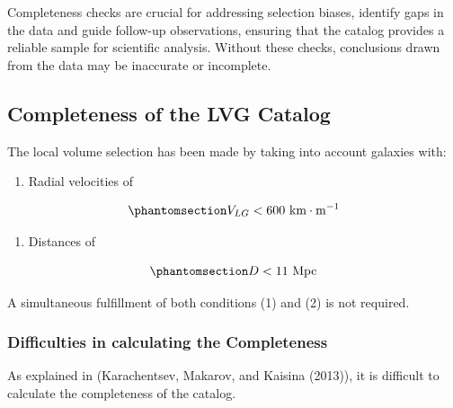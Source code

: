 \documentclass[
]{article}
\providecommand{\tightlist}{%
  \setlength{\itemsep}{0pt}\setlength{\parskip}{0pt}}\usepackage{longtable,booktabs,array}
\begin{document}
Completeness checks are crucial for addressing selection biases,
identify gaps in the data and guide follow-up observations, ensuring
that the catalog provides a reliable sample for scientific analysis.
Without these checks, conclusions drawn from the data may be inaccurate
or incomplete.

\subsection{Completeness of the LVG
Catalog}\label{completeness-of-the-lvg-catalog}

The local volume selection has been made by taking into account galaxies
with:

\begin{enumerate}
\def\labelenumi{\arabic{enumi}.}
\tightlist
\item
  Radial velocities of
\end{enumerate}

\begin{equation}\phantomsection\label{eq-lvg-vel}{
     V_{LG}<600 \text{ km}\cdot\text{m}^{-1}
}\end{equation}

\begin{enumerate}
\def\labelenumi{\arabic{enumi}.}
\tightlist
\item
  Distances of
\end{enumerate}

\begin{equation}\phantomsection\label{eq-lvg-dis}{
       D<11\ \text{Mpc}
}\end{equation}

A simultaneous fulfillment of both conditions (1) and (2) is not
required.

\subsubsection{Difficulties in calculating the
Completeness}\label{difficulties-in-calculating-the-completeness}

As explained in (Karachentsev, Makarov, and Kaisina (2013)), it is
difficult to calculate the completeness of the catalog.
\end{document}
